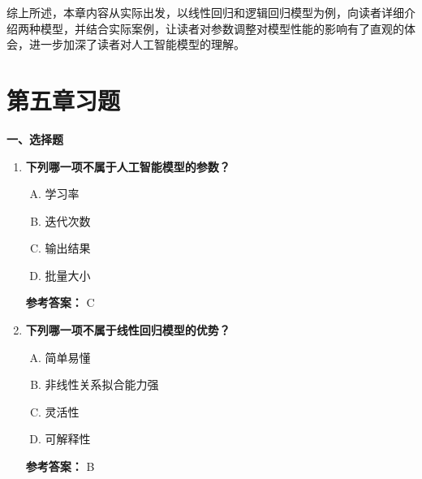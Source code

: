综上所述，本章内容从实际出发，以线性回归和逻辑回归模型为例，向读者详细介绍两种模型，并结合实际案例，让读者对参数调整对模型性能的影响有了直观的体会，进一步加深了读者对人工智能模型的理解。

\section{第五章习题}

\textbf{一、选择题}

\begin{enumerate}
   \item \textbf{下列哪一项不属于人工智能模型的参数？}
  \begin{enumerate}[A.]
    \item 学习率
    \item 迭代次数
    \item 输出结果
    \item 批量大小
  \end{enumerate}

  \textbf{参考答案：} C

  \item \textbf{下列哪一项不属于线性回归模型的优势？}
  \begin{enumerate}[A.]
    \item 简单易懂
    \item 非线性关系拟合能力强
    \item 灵活性
    \item 可解释性
  \end{enumerate}

  \textbf{参考答案：} B
  \end{enumerate}

